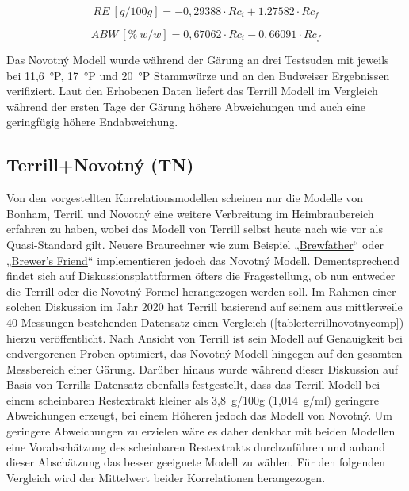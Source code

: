 \documentclass[a4paper,parskip=half]{scrartcl}
\newcommand{\bxic}{\mathit{Rc}_i}
\newcommand{\bxfc}{\mathit{Rc}_f}
\newcommand{\abw}{\mathit{ABW}}
\newcommand{\rex}{\mathit{RE}}
\begin{document}
\begin{equation}
\rex\:[g/100g] = -0,29388 \cdot \bxic + 1.27582 \cdot \bxfc
\label{eq:novotnyre}
\end{equation}

\begin{equation}
\abw\:[\%\:w/w] = 0,67062 \cdot \bxic - 0,66091 \cdot \bxfc
\label{eq:novotnyabw}
\end{equation}

Das Novotný Modell wurde während der Gärung an drei Testsuden mit jeweils
bei 11,6~°P, 17~°P und 20~°P Stammwürze und an den Budweiser
Ergebnissen verifiziert. Laut den Erhobenen Daten liefert das Terrill
Modell im Vergleich während der ersten Tage der Gärung höhere
Abweichungen und auch eine geringfügig höhere Endabweichung.
\autocite{Novotny2017a,Novotny2017}

\subsection*{Terrill+Novotný (TN)}

Von den vorgestellten Korrelationsmodellen scheinen nur die
Modelle von Bonham, Terrill und Novotný eine weitere Verbreitung im Heimbraubereich erfahren zu haben, wobei das Modell von Terrill selbst
heute nach wie vor als Quasi-Standard gilt. Neuere Braurechner
wie zum Beispiel „\href{https://brewfather.app}{Brewfather}“
oder „\href{https://www.brewersfriend.com/refractometer-calculator}
{Brewer's Friend}“ implementieren jedoch das Novotný Modell.
Dementsprechend findet sich auf Diskussionsplattformen öfters die Fragestellung, ob nun
entweder die Terrill oder die Novotný Formel herangezogen werden
soll. Im Rahmen einer solchen Diskussion im Jahr 2020 hat Terrill
basierend auf seinem aus mittlerweile 40 Messungen bestehenden Datensatz
einen Vergleich (\autoref{table:terrillnovotnycomp}) hierzu veröffentlicht.
Nach Ansicht von Terrill ist sein Modell auf Genauigkeit bei endvergorenen
Proben optimiert, das Novotný Modell hingegen auf den gesamten
Messbereich einer Gärung. Darüber hinaus wurde während dieser Diskussion
auf Basis von Terrills Datensatz ebenfalls festgestellt, dass das
Terrill Modell bei einem scheinbaren Restextrakt kleiner als 3,8~g/100g 
(1,014~g/ml) geringere Abweichungen erzeugt, bei einem Höheren jedoch
das Modell von Novotný. Um geringere Abweichungen zu erzielen wäre es
daher denkbar mit beiden Modellen eine Vorabschätzung des scheinbaren Restextrakts durchzuführen und anhand dieser Abschätzung das besser
geeignete Modell zu wählen. Für den folgenden Vergleich wird der
Mittelwert beider Korrelationen herangezogen. \autocite{h22lude2020}
\end{document}
